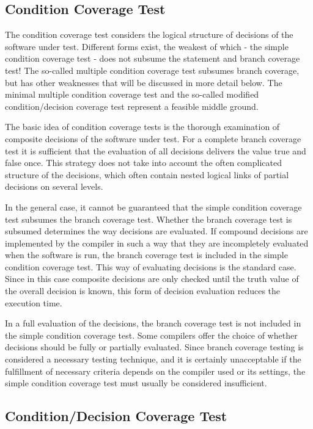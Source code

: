 \documentclass[master,english,smartquotes,apa]{hgbthesis}
\begin{document}
	\subsection{Condition Coverage Test}

	The condition coverage test considers the logical structure of decisions of the software under test. Different forms exist, the weakest of which - the simple condition coverage test - does not subsume the statement and branch coverage test! The so-called multiple condition coverage test subsumes branch coverage, but has other weaknesses that will be discussed in more detail below. The minimal multiple condition coverage test and the so-called modified condition/decision coverage test represent a feasible middle ground.

	The basic idea of condition coverage tests is the thorough examination of composite decisions of the software under test. For a complete branch coverage test it is sufficient that the evaluation of all decisions delivers the value true and false once. This strategy does not take into account the often complicated structure of the decisions, which often contain nested logical links of partial decisions on several levels.

	In the general case, it cannot be guaranteed that the simple condition coverage test subsumes the branch coverage test. Whether the branch coverage test is subsumed determines the way decisions are evaluated. If compound decisions are implemented by the compiler in such a way that they are incompletely evaluated when the software is run, the branch coverage test is included in the simple condition coverage test. This way of evaluating decisions is the standard case. Since in this case composite decisions are only checked until the truth value of the overall decision is known, this form of decision evaluation reduces the execution time.

	In a full evaluation of the decisions, the branch coverage test is not included in the simple condition coverage test. Some compilers offer the choice of whether decisions should be fully or partially evaluated. Since branch coverage testing is considered a necessary testing technique, and it is certainly unacceptable if the fulfillment of necessary criteria depends on the compiler used or its settings, the simple condition coverage test must usually be considered insufficient.

	\subsection{Condition/Decision Coverage Test}
\end{document}
